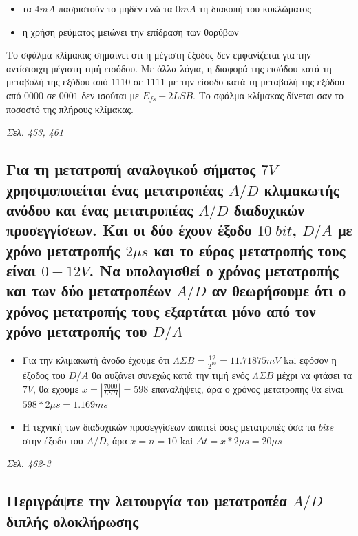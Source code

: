 \documentclass{article}
\begin{document}
\begin{itemize}
    \item τα $4mA$ πασριστούν το μηδέν ενώ τα $0mA$ τη διακοπή του κυκλώματος
    \item η χρήση ρεύματος μειώνει την επίδραση των θορύβων
\end{itemize}

Το σφάλμα κλίμακας σημαίνει ότι η μέγιστη έξοδος δεν εμφανίζεται για την αντίστοιχη μέγιστη τιμή εισόδου. Με άλλα λόγια, η διαφορά της εισόδου κατά τη μεταβολή της 
εξόδου από $1110$ σε $1111$ με την είσοδο κατά τη μεταβολή της εξόδου από $0000$ σε $0001$ δεν ισούται με $E_{fs}-2LSB$. Το σφάλμα κλίμακας δίνεται σαν το ποσοστό 
της πλήρους κλίμακας.

\emph{Σελ. 453, 461}

\subsection{Για τη μετατροπή αναλογικού σήματος $7V$ χρησιμοποιείται ένας μετατροπέας $A/D$ κλιμακωτής ανόδου και ένας μετατροπέας $Α/D$ διαδοχικών προσεγγίσεων. Και οι δύο έχουν έξοδο 
$10\; bit$, $D/A$ με χρόνο μετατροπής $2\mu s$ και το εύρος μετατροπής τους είναι $0-12V$. Να υπολογισθεί ο χρόνος μετατροπής και των δύο μετατροπέων $A/D$ αν θεωρήσουμε ότι ο χρόνος
μετατροπής τους εξαρτάται μόνο από τον χρόνο μετατροπής του $D/A$}
    
\begin{itemize}
    \item Για την κλιμακωτή άνοδο έχουμε ότι $ΛΣΒ = \frac{12}{2^{10}} = 11.71875mV$ kai εφόσον η έξοδος του $D/A$ θα αυξάνει συνεχώς κατά την τιμή ενός $ΛΣΒ$ μέχρι να φτάσει τα $7V$, 
        θα έχουμε $x = |\frac{7000}{LSB}| = 598$ επαναλήψεις, άρα ο χρόνος μετατροπής θα είναι $598*2\mu s = 1.169ms$
    \item Η τεχνική των διαδοχικών προσεγγίσεων απαιτεί όσες μετατροπές όσα τα $bits$ στην έξοδο του $A/D$, άρα $x = n = 10$ kai $\Delta t = x * 2\mu s = 20\mu s$
\end{itemize}
\emph{Σελ. 462-3}

\subsection{Περιγράψτε την λειτουργία του μετατροπέα $A/D$ διπλής 
ολοκλήρωσης}
\end{document}
